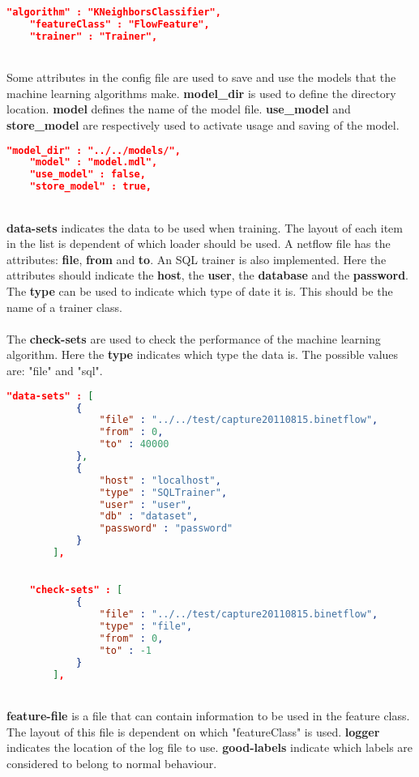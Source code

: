 \begin{lstlisting}[language=json,firstnumber=1]
    "algorithm" : "KNeighborsClassifier",
    "featureClass" : "FlowFeature",
    "trainer" : "Trainer",
\end{lstlisting}~\\
\noindent Some attributes in the config file are used to save and use the models that the machine learning algorithms make. \textbf{model\_dir} is used to define the directory location. \textbf{model} defines the name of the model file. \textbf{use\_model} and \textbf{store\_model} are respectively used to activate usage and saving of the model. \\

\begin{lstlisting}[language=json,firstnumber=1]
    "model_dir" : "../../models/",
    "model" : "model.mdl",
    "use_model" : false,
    "store_model" : true,
\end{lstlisting}~\\
\noindent \textbf{data-sets} indicates the data to be used when training. The layout of each item in the list is dependent of which loader should be used. A netflow file has the attributes: \textbf{file}, \textbf{from} and \textbf{to}. An SQL trainer is also implemented. Here the attributes should indicate the \textbf{host}, the \textbf{user}, the \textbf{database} and the \textbf{password}. The \textbf{type} can be used to indicate which type of date it is. This should be the name of a trainer class. \\
\\
The \textbf{check-sets} are used to check the performance of the machine learning algorithm. Here the \textbf{type} indicates which type the data is. The possible values are: "file" and "sql". \\

\begin{lstlisting}[language=json,firstnumber=1]
    "data-sets" : [
            {
                "file" : "../../test/capture20110815.binetflow",
                "from" : 0,
                "to" : 40000
            },
            {
                "host" : "localhost",
                "type" : "SQLTrainer",
                "user" : "user",
                "db" : "dataset",
                "password" : "password"
            }
        ],
    

    "check-sets" : [
            {
                "file" : "../../test/capture20110815.binetflow",
                "type" : "file",
                "from" : 0,
                "to" : -1
            }
        ],
\end{lstlisting}~\\
\noindent \textbf{feature-file} is a file that can contain information to be used in the feature class. The layout of this file is dependent on which "featureClass" is used. \textbf{logger} indicates the location of the log file to use. \textbf{good-labels} indicate which labels are considered to belong to normal behaviour.

